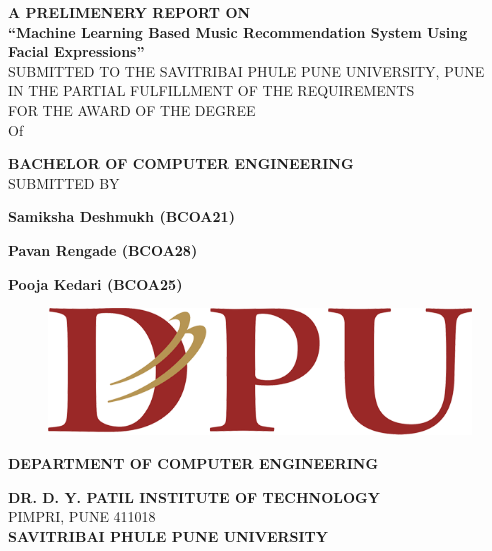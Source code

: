 \documentclass[12pt]{report}
\begin{document}

\centering \large \textbf  {A PRELIMENERY REPORT ON   }\\
\vspace{0.9 cm}
\Large \textbf{“Machine Learning Based Music Recommendation System
Using Facial Expressions”}\\
\vspace{0.5 cm}
\normalsize{SUBMITTED TO THE SAVITRIBAI PHULE PUNE UNIVERSITY, PUNE}\\
\normalsize{IN THE PARTIAL FULFILLMENT OF THE REQUIREMENTS}\\
\normalsize{  FOR THE AWARD OF THE DEGREE}\\
\vspace{0.8 cm}
\normalsize {Of}\\
\vspace{0.8 cm}

\Large\textbf{BACHELOR OF COMPUTER ENGINEERING}\\
\vspace{0.9 cm}
\large{SUBMITTED BY}\\
\vspace{0.3 cm}

\large \textbf  {Samiksha Deshmukh (BCOA21)}

\large \textbf  {Pavan Rengade (BCOA28) }

\large \textbf{Pooja Kedari (BCOA25)}


\begin{figure}[h]
\centering
\includegraphics[scale=0.6]{Logo.png }
\end{figure}

\centering \Large \textbf  {DEPARTMENT OF COMPUTER ENGINEERING}\\
\vspace{0.4cm}

\large \textbf  {DR. D. Y. PATIL INSTITUTE OF TECHNOLOGY}\\
\normalsize {PIMPRI, PUNE 411018}\\
\vspace{0.2 cm}
\large \textbf{SAVITRIBAI PHULE PUNE UNIVERSITY}\\
\end{document}
